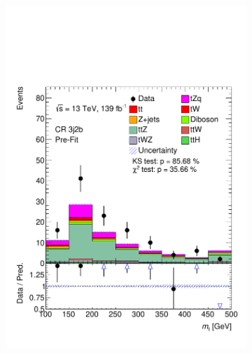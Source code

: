 \begin{figure}[h!]
\begin{subfigure}[b]{0.32\linewidth}
    \includegraphics[width=\linewidth]{ubonn-thesis/Chapters/Chapters_05/Figure/CR_ttZ/CR_3j2b_Top_mass.pdf} 
  \end{subfigure}%
  \newline
  \begin{subfigure}[b]{0.32\linewidth}
    \centering

\end{subfigure}
\end{figure}
